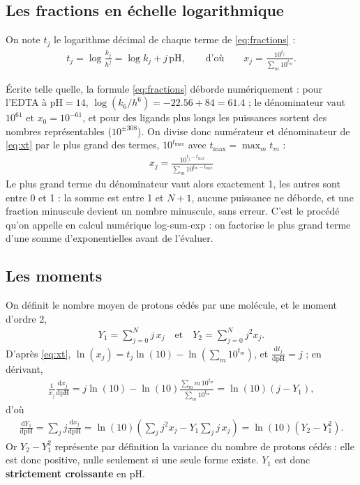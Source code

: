 \documentclass[a4paper,11pt]{article}
\newcommand\gras[1]{\textbf{#1}}
\newcommand\rsltm[1]{\boxed{#1}}
\newcommand\pH{\ensuremath{\mathrm{pH}}\xspace}
\newcommand\ddp[2]{\frac{\mathrm{d}#1}{\mathrm{d}#2}}
\newcommand\pare[1]{\left(#1\right)}
\newcommand\et{\quad\text{et}\quad}
\begin{document}
\subsection{Les fractions en échelle logarithmique}
On note $t_j$ le logarithme décimal de chaque terme de \eqref{eq:fractions} :
\begin{align}
t_j=\log\frac{k_j}{h^j}=\log k_j+j\,\pH,
\qquad\text{d'où}\qquad
x_j=\frac{10^{t_j}}{\sum_m10^{t_m}}.
\label{eq:xt}
\end{align}
\begin{algo}
Écrite telle quelle, la formule \eqref{eq:fractions} déborde numériquement : pour l'EDTA à $\pH=14$, $\log(k_6/h^6)=-\num{22,56}+84=\num{61,4}$ ; le dénominateur vaut $10^{61}$ et $x_0=10^{-61}$, et pour des ligands plus longs les puissances sortent des nombres représentables ($10^{\pm308}$).
On divise donc numérateur et dénominateur de \eqref{eq:xt} par le plus grand des termes, $10^{t_\text{max}}$ avec $t_\text{max}=\max_mt_m$ :
\begin{align}
\rsltm{x_j=\frac{10^{t_j-t_\text{max}}}{\sum_m10^{t_m-t_\text{max}}}}
\label{eq:lse}
\end{align}
Le plus grand terme du dénominateur vaut alors exactement 1, les autres sont entre 0 et 1 : la somme est entre 1 et $N+1$, aucune puissance ne déborde, et une fraction minuscule devient un nombre minuscule, sans erreur.
C'est le procédé qu'on appelle en calcul numérique \og log-sum-exp\fg{} : on factorise le plus grand terme d'une somme d'exponentielles avant de l'évaluer.
\end{algo}

\subsection{Les moments}
On définit le nombre moyen de protons cédés par une molécule, et le moment d'ordre 2,
\begin{align}
Y_1=\sum_{j=0}^Nj\,x_j \et Y_2=\sum_{j=0}^Nj^2x_j .
\end{align}
D'après \eqref{eq:xt}, $\ln(x_j)=t_j\ln(10)-\ln\pare{\sum_m10^{t_m}}$, et $\ddp{t_j}\pH=j$ ; en dérivant,
\begin{align}
\frac1{x_j}\ddp{x_j}\pH=j\ln(10)-\ln(10)\frac{\sum_mm\,10^{t_m}}{\sum_m10^{t_m}}=\ln(10)\pare{j-Y_1},
\end{align}
d'où
\begin{align}
\ddp{Y_1}\pH=\sum_jj\ddp{x_j}\pH=\ln(10)\pare{\sum_jj^2x_j-Y_1\sum_jj\,x_j}=\ln(10)\pare{Y_2-Y_1^2}.
\label{eq:dY1}
\end{align}
Or $Y_2-Y_1^2$ représente par définition la variance du nombre de protons cédés : elle est donc positive, nulle seulement si une seule forme existe.
$Y_1$ est donc \gras{strictement croissante} en \pH.
\end{document}
